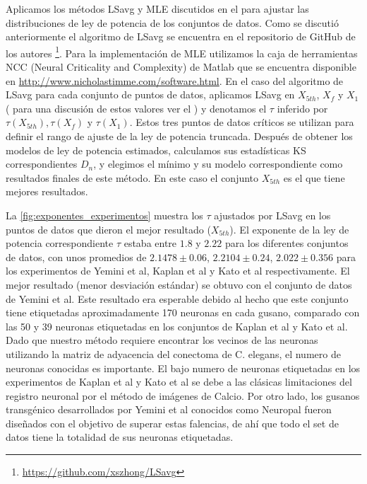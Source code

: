 Aplicamos los métodos LSavg y MLE discutidos en el  para ajustar las distribuciones de ley de potencia de los conjuntos de datos. Como se discutió anteriormente el algoritmo de LSavg se encuentra en el repositorio de GitHub de los autores \footnote{\url{https://github.com/xszhong/LSavg}}.  Para la implementación de MLE utilizamos la caja de herramientas NCC (Neural Criticality and Complexity) de  Matlab \cite{marshall_analysis_2016}  que se encuentra disponible en \url{http://www.nicholastimme.com/software.html}.  En el caso del algoritmo de LSavg  para cada conjunto de puntos de datos,  aplicamos LSavg en  $X_{5th}$, $X_f$ y $X_1$ ( para una discusión de estos valores ver el )   y denotamos el $\tau$ inferido por $\tau(X_{5th}), \tau(X_f)$ y $\tau(X_1)$. Estos tres puntos de datos críticos se utilizan para definir el rango de ajuste de la ley de potencia truncada.  Después de obtener los modelos de ley de potencia estimados, calculamos sus estadísticas KS correspondientes $D_n$, y elegimos  el mínimo y su modelo correspondiente como resultados finales de este método. En este caso el conjunto $X_{5th}$ es el que tiene mejores resultados. 

 La \cref{fig:exponentes_experimentos}   muestra los $\tau$ ajustados por LSavg en los puntos de datos que dieron el mejor resultado ($X_{5th}$).   El exponente de la ley de potencia correspondiente $\tau$ estaba entre $1.8$ y $2.22$ para los diferentes conjuntos de datos, con unos promedios de $2.1478\pm 0.06$, $2.2104\pm0.24$, $2.022\pm0.356$ para los experimentos de Yemini et al, Kaplan et al y Kato et al respectivamente. El mejor resultado (menor desviación estándar) se obtuvo con el conjunto de datos de Yemini et al. Este resultado  era esperable debido al hecho que este conjunto tiene etiquetadas aproximadamente 170 neuronas en cada gusano, comparado con las 50 y 39 neuronas etiquetadas en los conjuntos de Kaplan et al y Kato et al.  Dado que nuestro método requiere encontrar los vecinos de las neuronas utilizando la matriz de adyacencia del conectoma de C. elegans, el numero de neuronas conocidas es importante. El bajo numero de neuronas etiquetadas en los experimentos de Kaplan et al y Kato et al  se debe a las clásicas  limitaciones del registro neuronal por el método de imágenes de Calcio.  Por otro lado, los gusanos transgénico desarrollados por Yemini et al conocidos como  Neuropal fueron diseñados con el objetivo de superar estas falencias, de ahí que todo el set de datos tiene la totalidad de sus neuronas etiquetadas. 
 

